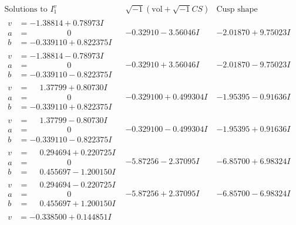 \documentclass[1p]{elsarticle_modified}
\theoremstyle{definition}
\newcommand{\I}{\sqrt{-1}}
\begin{document}
$$\begin{array}{c|c|c}  
\text{Solutions to }I^v_{1}& \I (\text{vol} + \sqrt{-1}CS) & \text{Cusp shape}\\
 \hline 
\begin{aligned}
v &= -1.38814 + 0.78973 I \\
a &= \phantom{-0.000000 } 0 \\
b &= -0.339110 + 0.822375 I\end{aligned}
 & -0.32910 - 3.56046 I & -2.01870 + 9.75023 I \\ \hline\begin{aligned}
v &= -1.38814 - 0.78973 I \\
a &= \phantom{-0.000000 } 0 \\
b &= -0.339110 - 0.822375 I\end{aligned}
 & -0.32910 + 3.56046 I & -2.01870 - 9.75023 I \\ \hline\begin{aligned}
v &= \phantom{-}1.37799 + 0.80730 I \\
a &= \phantom{-0.000000 } 0 \\
b &= -0.339110 + 0.822375 I\end{aligned}
 & -0.329100 + 0.499304 I & -1.95395 - 0.91636 I \\ \hline\begin{aligned}
v &= \phantom{-}1.37799 - 0.80730 I \\
a &= \phantom{-0.000000 } 0 \\
b &= -0.339110 - 0.822375 I\end{aligned}
 & -0.329100 - 0.499304 I & -1.95395 + 0.91636 I \\ \hline\begin{aligned}
v &= \phantom{-}0.294694 + 0.220725 I \\
a &= \phantom{-0.000000 } 0 \\
b &= \phantom{-}0.455697 - 1.200150 I\end{aligned}
 & -5.87256 - 2.37095 I & -6.85700 + 6.98324 I \\ \hline\begin{aligned}
v &= \phantom{-}0.294694 - 0.220725 I \\
a &= \phantom{-0.000000 } 0 \\
b &= \phantom{-}0.455697 + 1.200150 I\end{aligned}
 & -5.87256 + 2.37095 I & -6.85700 - 6.98324 I \\ \hline\begin{aligned}
v &= -0.338500 + 0.144851 I \\

\end{aligned}
\end{array}$$
\end{document}
